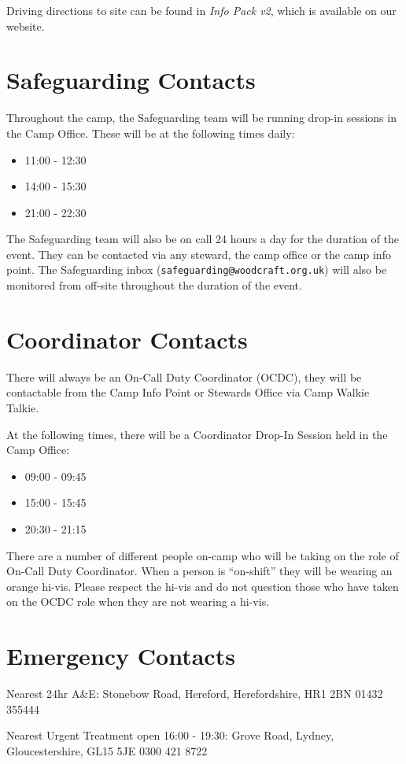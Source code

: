 \documentclass[a4paper, 11pt]{report}
\begin{document}
Driving directions to site can be found in \textit{Info Pack v2}, which is available on our website. 

\section{Safeguarding Contacts}
Throughout the camp, the Safeguarding team will be running drop-in sessions in the Camp Office. These will be at the following times daily:
\begin{itemize}
    \item 11:00 - 12:30
    \item 14:00 - 15:30
    \item 21:00 - 22:30
\end{itemize}
The Safeguarding team will also be on call 24 hours a day for the duration of the event. They can be contacted via any steward, the camp office or the camp info point. The Safeguarding inbox (\texttt{safeguarding@woodcraft.org.uk}) will also be monitored from off-site throughout the duration of the event.

\section{Coordinator Contacts}
There will always be an On-Call Duty Coordinator (OCDC), they will be contactable from the Camp Info Point or Stewards Office via Camp Walkie Talkie.\nl

At the following times, there will be a Coordinator Drop-In Session held in the Camp Office:
\begin{itemize}
    \item 09:00 - 09:45
    \item 15:00 - 15:45
    \item 20:30 - 21:15
\end{itemize}
There are a number of different people on-camp who will be taking on the role of On-Call Duty Coordinator. When a person is ``on-shift'' they will be wearing an orange hi-vis. Please respect the hi-vis and do not question those who have taken on the OCDC role when they are not wearing a hi-vis. 

\section{Emergency Contacts}
Nearest 24hr A\&E: Stonebow Road, Hereford, Herefordshire, HR1 2BN 01432 355444\nl

Nearest Urgent Treatment open 16:00 - 19:30: Grove Road, Lydney, Gloucestershire, GL15 5JE 0300 421 8722\nl
\end{document}

